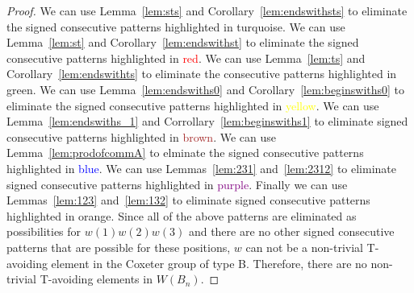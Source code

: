 \begin{proof}
We can use Lemma~\ref{lem:sts} and Corollary~\ref{lem:endswithsts} to eliminate the signed consecutive patterns highlighted in \textcolor{turq}{turquoise}. We can use Lemma~\ref{lem:st} and Corollary~\ref{lem:endswithst} to eliminate the signed consecutive patterns highlighted in \textcolor{red}{red}. We can use Lemma~\ref{lem:ts} and Corollary~\ref{lem:endswithts} to eliminate the consecutive patterns highlighted in \textcolor{ggreen}{green}.  We can use Lemma~\ref{lem:endswiths0} and Corollary~\ref{lem:beginswiths0} to eliminate the signed consecutive patterns highlighted in \textcolor{yellow}{yellow}. We can use Lemma~\ref{lem:endswiths_1} and Corrollary~\ref{lem:beginswiths1} to eliminate signed consecutive patterns highlighted in \textcolor{brown}{brown}. We can use Lemma~\ref{lem:prodofcommA} to elminate the signed consecutive patterns highlighted in \textcolor{blue}{blue}. We can use Lemmas~\ref{lem:231} and~\ref{lem:2312} to eliminate signed consecutive patterns highlighted in \textcolor{purple}{purple}. Finally we can use Lemmas~\ref{lem:123} and~\ref{lem:132} to eliminate signed consecutive patterns highlighted in \textcolor{orange2}{orange}. Since all of the above patterns are eliminated as possibilities for $w(1)w(2)w(3)$ and there are no other signed consecutive patterns that are possible for these positions, $w$ can not be a non-trivial T-avoiding element in the Coxeter group of type B. Therefore, there are no non-trivial T-avoiding elements in $W(B_n)$.
\end{proof}